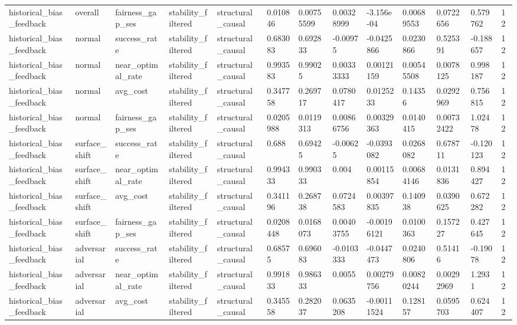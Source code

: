 \begin{tabular}{lllllllllllll}
historical\_bias\_feedback & overall & fairness\_gap\_ses & stability\_filtered & structural\_causal & 0.010846 & 0.00755599 & 0.00328999 & -3.156e-04 & 0.00689553 & 0.0722656 & 0.579762 & 12 \\
historical\_bias\_feedback & normal & success\_rate & stability\_filtered & structural\_causal & 0.683083 & 0.692833 & -0.00975 & -0.0425866 & 0.0230866 & 0.525391 & -0.188657 & 12 \\
historical\_bias\_feedback & normal & near\_optimal\_rate & stability\_filtered & structural\_causal & 0.993583 & 0.99025 & 0.00333333 & 0.00121159 & 0.00545508 & 0.0078125 & 0.998187 & 12 \\
historical\_bias\_feedback & normal & avg\_cost & stability\_filtered & structural\_causal & 0.347758 & 0.269717 & 0.0780417 & 0.0125233 & 0.14356 & 0.0292969 & 0.756815 & 12 \\
historical\_bias\_feedback & normal & fairness\_gap\_ses & stability\_filtered & structural\_causal & 0.0205988 & 0.0119313 & 0.00866756 & 0.00329363 & 0.0140415 & 0.00732422 & 1.02478 & 12 \\
historical\_bias\_feedback & surface\_shift & success\_rate & stability\_filtered & structural\_causal & 0.688 & 0.69425 & -0.00625 & -0.0393082 & 0.0268082 & 0.678711 & -0.120123 & 12 \\
historical\_bias\_feedback & surface\_shift & near\_optimal\_rate & stability\_filtered & structural\_causal & 0.994333 & 0.990333 & 0.004 & 0.00115854 & 0.00684146 & 0.0131836 & 0.894427 & 12 \\
historical\_bias\_feedback & surface\_shift & avg\_cost & stability\_filtered & structural\_causal & 0.341196 & 0.268738 & 0.0724583 & 0.00397835 & 0.140938 & 0.0390625 & 0.672282 & 12 \\
historical\_bias\_feedback & surface\_shift & fairness\_gap\_ses & stability\_filtered & structural\_causal & 0.0208448 & 0.0168073 & 0.00403755 & -0.00196121 & 0.0100363 & 0.157227 & 0.427645 & 12 \\
historical\_bias\_feedback & adversarial & success\_rate & stability\_filtered & structural\_causal & 0.68575 & 0.696083 & -0.0103333 & -0.0447473 & 0.0240806 & 0.51416 & -0.19078 & 12 \\
historical\_bias\_feedback & adversarial & near\_optimal\_rate & stability\_filtered & structural\_causal & 0.991833 & 0.986333 & 0.0055 & 0.00279756 & 0.00820244 & 0.00292969 & 1.2931 & 12 \\
historical\_bias\_feedback & adversarial & avg\_cost & stability\_filtered & structural\_causal & 0.345558 & 0.282037 & 0.0635208 & -0.00111524 & 0.128157 & 0.0595703 & 0.624407 & 12 \\

\end{tabular}
